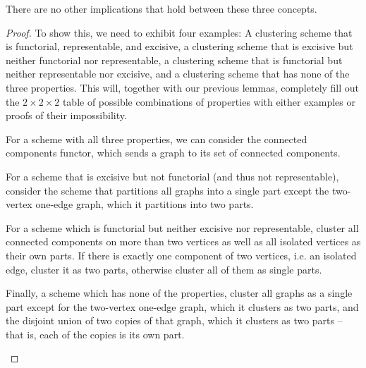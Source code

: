 \documentclass[a4paper,reqno,oneside]{article} %
\begin{document}
\begin{lemma}
There are no other implications that hold between these three concepts.
\begin{proof}
To show this, we need to exhibit four examples: A clustering scheme that is functorial, representable, and excisive, a clustering scheme that is excisive but neither functorial nor representable, a clustering scheme that is functorial but neither representable nor excisive, and a clustering scheme that has none of the three properties. This will, together with our previous lemmas, completely fill out the $2 \times 2 \times 2$ table of possible combinations of properties with either examples or proofs of their impossibility.



\begin{example}\label{ex_allthreeprops}
For a scheme with all three properties, we can consider the connected components functor, which sends a graph to its set of connected components.
\end{example}

\begin{example}\label{ex_excnotfunctnotrepr}
For a scheme that is excisive but not functorial (and thus not representable), consider the scheme that partitions all graphs into a single part except the two-vertex one-edge graph, which it partitions into two parts.
\end{example}

\begin{example}\label{ex_functnotexcnotrepr}
For a scheme which is functorial but neither excisive nor representable, cluster all connected components on more than two vertices as well as all isolated vertices as their own parts. If there is exactly one component of two vertices, i.e. an isolated edge, cluster it as two parts, otherwise cluster all of them as single parts.
\end{example}

\begin{example}\label{ex_noprops}
Finally, a scheme which has none of the properties, cluster all graphs as a single part except for the two-vertex one-edge graph, which it clusters as two parts, and the disjoint union of two copies of that graph, which it clusters as two parts -- that is, each of the copies is its own part.
\end{example}

\end{proof}
\end{lemma}
\end{document}
